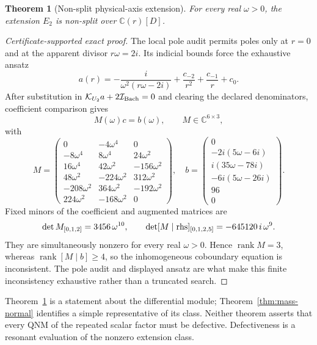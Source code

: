 \documentclass[11pt]{article}
\newtheorem{theorem}{Theorem}[section]
\theoremstyle{remark}
\newcommand{\C}{\mathbb C}
\begin{document}
\begin{theorem}[Non-split physical-axis extension]\label{thm:nonsplit}
For every real \(\omega>0\), the extension \(E_2\) is non-split over
\(\C(r)[D]\).
\end{theorem}

\begin{proof}[Certificate-supported exact proof]
The local pole audit permits poles only at \(r=0\) and at the apparent
divisor \(r\omega=2i\).  Its indicial bounds force the exhaustive ansatz
\[
 a(r)=-\frac{i}{\omega^2(r\omega-2i)}
 +\frac{c_{-2}}{r^2}+\frac{c_{-1}}r+c_0 .
\]
After substitution in
\(\mathcal K_{U_2}a+2\mathcal I_{\rm Bach}=0\) and clearing the declared
denominators, coefficient comparison gives
\[
 M(\omega)c=b(\omega),\qquad M\in\C^{6\times3},
\]
with
\[
M=
\left(\begin{smallmatrix}
0&-4\omega^4&0\\
-8\omega^4&8\omega^4&24\omega^2\\
16\omega^4&42\omega^2&-156\omega^2\\
48\omega^2&-224\omega^2&312\omega^2\\
-208\omega^2&364\omega^2&-192\omega^2\\
224\omega^2&-168\omega^2&0
\end{smallmatrix}\right),
\quad
b=
\left(\begin{smallmatrix}
0\\-2i(5\omega-6i)\\i(35\omega-78i)\\
-6i(5\omega-26i)\\96\\0
\end{smallmatrix}\right).
\]
Fixed minors of the coefficient and augmented matrices are
\[
 \det M_{[0,1,2]}=3456\,\omega^{10},
 \qquad
 \det[M\mid{\rm rhs}]_{[0,1,2,5]}
 =-645120\,i\,\omega^9.
\]
They are simultaneously nonzero for every real \(\omega>0\).  Hence
\(\operatorname{rank}M=3\), whereas
\(\operatorname{rank}[M\mid b]\ge4\), so the inhomogeneous coboundary
equation is inconsistent.  The pole audit and displayed ansatz are what
make this finite inconsistency exhaustive rather than a truncated search.
\end{proof}

Theorem~\ref{thm:nonsplit} is a statement about the differential module;
Theorem~\ref{thm:mass-normal} identifies a simple representative of its
class.  Neither theorem asserts that every QNM of the repeated scalar
factor must be defective.  Defectiveness is a resonant evaluation of the
nonzero extension class.
\end{document}
